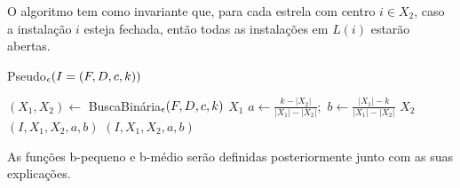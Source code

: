 O algoritmo tem como invariante que, para cada estrela com centro $i \in X_2$, caso a instalação $i$ esteja fechada, então todas as instalações em $L(i)$ estarão abertas.

\begin{algorithm}[H]
    \caption{\sc Pseudo$_\epsilon(I = (F,D,c,k))$}
    \begin{algorithmic}[1]
        \State $(X_1,X_2) \gets$ {\sc BuscaBinária$_\epsilon(F,D,c,k)$}
        \State \Return $X_1$
        \EndIf
        \State $a \gets \frac{k - |X_2|}{|X_1| - |X_2|};$ \quad $b \gets \frac{|X_1| - k}{|X_1| - |X_2|}$
            \State \Return $X_2$
            \State {}$(I,X_1,X_2,a,b)$
        \Else
            \State {}$(I,X_1,X_2,a,b)$
        \EndIf
    \end{algorithmic}
\end{algorithm}
As funções {\sc b-pequeno} e {\sc b-médio} serão definidas posteriormente junto com as suas explicações.

